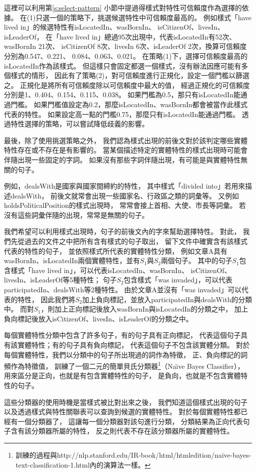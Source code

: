 這裡可以利用第\ref{s:select-pattern} 小節中提過得樣式對特性可信賴度作為選擇的依據。
在(1)只選一個的策略下，挑選候選特性中可信賴度最高的。
例如樣式「have lived in」的候選特性有isLocatedIn、wasBornIn、
isCitizenOf、livesIn、isLeaderOf，
在「have lived in」總過95次出現中，代表isLocatedIn有52次、wasBornIn 21次、
isCitizenOf 8次、livesIn 6次、isLeaderOf 2次，換算可信賴度分別為0.547、0.221、
0.084、0.063、0.021。
在策略(1)下，選擇可信賴度最高的isLocatedIn作為該樣式。
但這樣只會固定都選一個樣式，沒有辦法因應可能有多個樣式的情形，
因此有了策略(2)，對可信賴度進行正規化，設定一個門檻以篩選之。
正規化是將所有可信賴度除以可信賴度中最大的值，
經過正規化的可信賴度分別是1、0.404、0.154、0.115、0.038。
如果門檻為0.5，那只有isLocatedIn能通過門檻。
如果門檻值設定為0.2，那麼isLocatedIn、wasBornIn都會被當作此樣式代表的特性。
如果設定高一點的門檻0.75，那麼只有isLocatedIn能通過門檻。
透過特性選擇的策略，可以嘗試降低歧義的影響。

最後，除了使用挑選策略之外，
我們認為樣式出現的前後文對於該判定哪些實體特性存在或不存在是有影響的。
當某個描述特定的實體特性的樣式出現時可能會伴隨出現一些固定的字詞。
如果沒有那些字詞伴隨出現，有可能是與實體特性無關的句子。

例如，dealsWith是國家與國家間締約的特性，
其中樣式「divided into」若用來描述dealsWith，
前後文就常會出現一些國家名、行政區之類的詞彙等。
又例如holdsPoliticalPosition的樣式出現時，
常常會接上首相、大使、市長等詞彙。
若沒有這些詞彙伴隨的出現，常常是無關的句子。


我們希望可以利用樣式出現時，句子的前後文內的字來幫助選擇特性。
對此，
我們先從過去的文件之中把所有含有樣式的句子取出，
留下文件中確實含有該樣式代表的特性的句子，
並依照樣式所代表的實體特性分類，
例如文章A具有wasBornIn、isLocatedIn兩個實體特性，並有$S_1$與$S_2$兩個句子。
其中的句子$S_1$包含樣式「have lived in」，可以代表isLocatedIn、wasBornIn、
isCitizenOf、livesIn、isLeaderOf等5種特性；
句子$S_2$包含樣式「was invaded」，可以代表participatedIn、dealsWith等2種特性。
由於文章A並沒有「was invaded」可以代表的特性，
因此我們將$S_2$加上負向標記，並放入participatedIn與dealsWith的分類中。
而對$S_1$，則加上正向標記後放入wasBornIn與isLocatedIn的分類之中，
加上負向標記後放入isCitizenOf、livesIn、isLeaderOf的分類之中。

每個實體特性分類中包含了許多句子，有的句子具有正向標記，
代表這個句子具有該實體特性；有的句子具有負向標記，
代表這個句子不包含該實體分類。
對於每個實體特性，我們以分類中的句子所出現過的詞作為特徵，
正、負向標記的詞頻作為特徵值，
訓練了一個二元的簡單貝氏分類器\footnote{訓練的過程與http://nlp.stanford.edu/IR-book/html/htmledition/naive-bayes-text-classification-1.html內的演算法一樣。}（Na\"{\i}ve Bayes Classifier），
用來區分是正向，也就是有包含實體特性的句子，
是負向，也就是不包含實體特性的句子。

這些分類器的使用時機是當樣式被比對出來之後，
我們知道這個樣式出現的句子以及透過樣式與特性關聯表可以查詢到候選的實體特性。
對於每個實體特性都已經有一個分類器了，
這讓每一個分類器對該句進行分類，
分類結果為正向代表句子含有該分類器所屬的特性，
反之則代表不存在該分類器所屬的實體特性。

